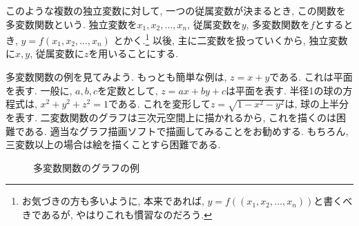         このような複数の独立変数に対して, 一つの従属変数が決まるとき, この関数を多変数関数という. 独立変数を$x_1,x_2,\dots,x_n$, 従属変数を$y$, 多変数関数を$f$とするとき, $y=f(x_1,x_2,\dots,x_n)$
        とかく.\footnote{お気づきの方も多いように, 本来であれば, $y=f((x_1,x_2,\dots,x_n))$と書くべきであるが, やはりこれも慣習なのだろう.}
        以後, 主に二変数を扱っていくから, 独立変数に$x,y$, 従属変数に$z$を用いることにする.

        多変数関数の例を見てみよう. もっとも簡単な例は, $z=x+y$である. これは平面を表す. 一般に, $a,b,c$を定数として, $z=ax+by+c$は平面を表す.
        半径1の球の方程式は, $x^2+y^2+z^2=1$である. これを変形して$z=\sqrt{1-x^2-y^2}$は, 球の上半分を表す.
        二変数関数のグラフは三次元空間上に描かれるから, これを描くのは困難である. 適当なグラフ描画ソフトで描画してみることをお勧めする. もちろん, 三変数以上の場合は絵を描くことすら困難である.

        \begin{figure}[h]
            \centering
            \begin{minipage}[t]{0.45\textwidth}
                \centering
            \end{minipage}
            \begin{minipage}[t]{0.45\textwidth}
                \centering
            \end{minipage}
            \caption{多変数関数のグラフの例}
        \end{figure}
    \clearpage
